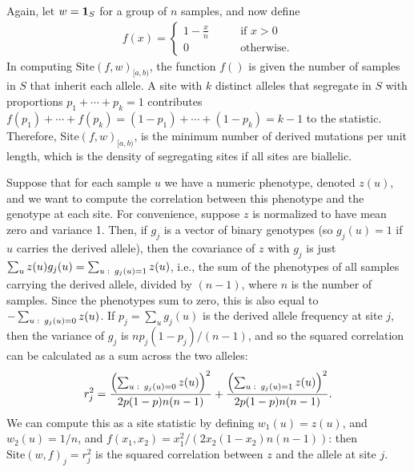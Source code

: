 \documentclass{article}
\newcommand{\site}{\mbox{Site}} %
\newcommand{\iw}{w} %
\begin{document}
\begin{example} \label{ex:segregating_sites}
    Again, let $\iw = \bone_{S}$ for a group of $n$ samples,
    and now define
    \begin{align*}
        f(x) = \begin{cases}
            1 - \frac{x}{n} \qquad &\text{if } x > 0 \\
            0 \qquad &\text{otherwise} .
        \end{cases}
    \end{align*}
    In computing $\site(f, \iw)_{[a,b)}$, the function $f()$ is given the number of samples in $S$
    that inherit each allele.
    A site with $k$ distinct alleles that segregate in $S$ with proportions $p_1 + \cdots + p_k = 1$
    contributes $f(p_1) + \cdots + f(p_k) = (1 - p_1) + \cdots + (1 - p_k) = k - 1$ to the statistic.
    Therefore, $\site(f, \iw)_{[a,b)}$, is the minimum number of derived mutations per unit length,
    which is the density of segregating sites if all sites are biallelic.
\end{example}


\begin{example} \label{ex:site_correlations}
    Suppose that for each sample $u$ we have a numeric phenotype, denoted $z(u)$,
    and we want to compute the correlation between this phenotype
    and the genotype at each site.
    For convenience, suppose $z$ is normalized
    to have mean zero and variance 1.
    Then, if $g_j$ is a vector of binary genotypes (so $g_j(u) = 1$ if $u$ carries the derived allele),
    then the covariance of $z$ with $g_j$ is just $\sum_u z(u) g_j(u) = \sum_{u \,\colon\, g_j(u) = 1} z(u)$,
    i.e., the sum of the phenotypes of all samples carrying the derived allele,
    divided by $(n - 1)$, where $n$ is the number of samples.
    Since the phenotypes sum to zero, this is also equal to
    $- \sum_{u \,\colon\, g_j(u) = 0} z(u)$.
    If $p_j = \sum_u g_j(u)$ is the derived allele frequency at site $j$,
    then the variance of $g_j$ is $n p_j (1-p_j) / (n-1)$,
    and so the squared correlation can be calculated as a sum across the two alleles:
    \begin{align*}
        r_j^2 =
        \frac{\left( \sum_{u \,\colon\, g_j(u) = 0} z(u)\right)^2}{2p(1-p)n(n-1)}
        + \frac{\left( \sum_{u \,\colon\, g_j(u) = 1} z(u)\right)^2}{2p(1-p)n(n-1)}  .
    \end{align*}
    We can compute this as a site statistic by defining $\iw_{1}(u) = z(u)$, and $\iw_{2}(u) = 1/n$,
    and $f(x_1, x_2) = x_1^2 / (2 x_2 (1 - x_2) n (n-1))$:
    then $\site(\iw, f)_j = r_j^2$ is the squared correlation between $z$ and the allele at site $j$.
\end{example}
\end{document}
